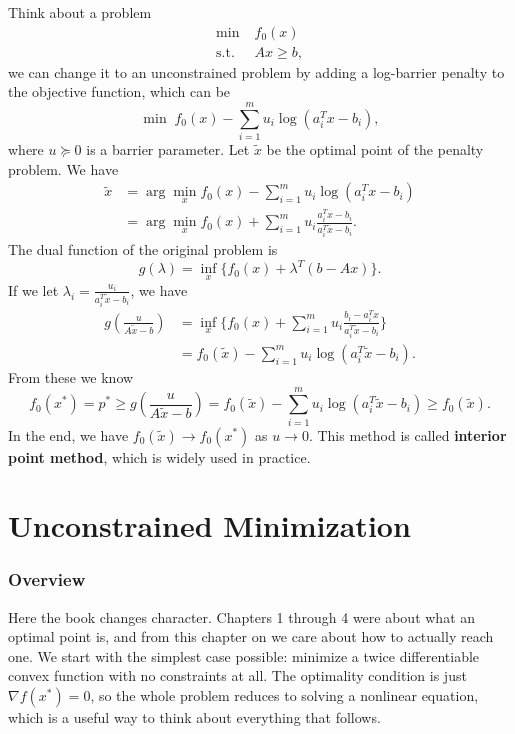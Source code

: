 \documentclass[lang=en,color=blue,mode=fancy,titlestyle=hang]{elegantbook}
\begin{document}
Think about a problem
\begin{align*}
\min \; &f_0(x)\\
\text{s.t.} \; &Ax \geq b,
\end{align*}
we can change it to an unconstrained problem by adding a log-barrier penalty to the objective function,
which can be
\[
\min \; f_0(x) - \sum_{i=1}^m u_i \log(a_i^T x - b_i),
\]
where $u \succeq 0$ is a barrier parameter. Let $\tilde{x}$ be the optimal point of the penalty problem.
We have
\begin{align*}
\tilde{x} &= \arg \min_x f_0(x) - \sum_{i=1}^m u_i \log(a_i^T x - b_i) \\
&= \arg \min_x f_0(x) + \sum_{i=1}^m u_i \frac{a_i^T x - b_i}{a_i^T \tilde{x} - b_i}.
\end{align*}
The dual function of the original problem is
\[
g(\lambda) = \inf_x \{f_0(x) + \lambda^T (b - Ax)\}.
\]
If we let $\lambda_i = \frac{u_i}{a_i^T \tilde{x} - b_i}$, we have
\begin{align*}
g(\frac{u}{A \tilde{x} - b}) &= \inf_x \{f_0(x) + \sum_{i=1}^m u_i \frac{b_i - a_i^T x}{a_i^T \tilde{x} - b_i}\}\\
&= f_0(\tilde{x}) - \sum_{i=1}^m u_i \log(a_i^T \tilde{x} - b_i).
\end{align*}
From these we know
\[
f_0(x^*) = p^* \geq g(\frac{u}{A \tilde{x} - b}) = f_0(\tilde{x}) - \sum_{i=1}^m u_i \log(a_i^T \tilde{x} - b_i) \geq f_0(\tilde{x}).
\]
In the end, we have $f_0(\tilde{x}) \to f_0(x^*)$ as $u \to 0$. This method is called \textbf{interior
point method}, which is widely used in practice.

\chapter{Unconstrained Minimization}

\subsection*{Overview}

Here the book changes character. Chapters 1 through 4 were about what an optimal point is,
and from this chapter on we care about how to actually reach one. We start with the simplest
case possible: minimize a twice differentiable convex function with no constraints at all.
The optimality condition is just $\nabla f(x^*) = 0$, so the whole problem reduces to
solving a nonlinear equation, which is a useful way to think about everything that follows.
\end{document}

